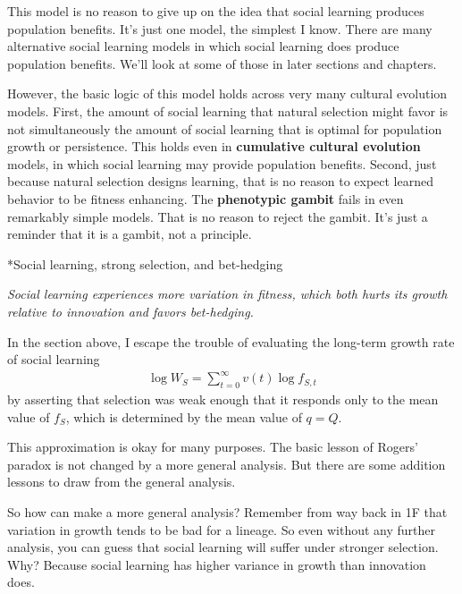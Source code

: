 \documentclass[10pt,reqno]{amsbook}
\makeatletter
\newcommand{\bemph}[1]{{\textbf{\textcolor{bemphcol}{#1}}}}
\renewcommand\section{\@startsection{section}{1}
\z@{.7\linespacing\@plus\linespacing}{.5\linespacing}
{\large\bfseries\itshape}}
\numberwithin{equation}{chapter}
\newenvironment{precis}
{\noi\itshape}
{\vspace{6pt}}
\newcommand{\noi}{\noindent}
\makeatother
\begin{document}
This model is no reason to give up on the idea that social learning produces population benefits. It's just one model, the simplest I know. There are many alternative social learning models in which social learning does produce population benefits. We'll look at some of those in later sections and chapters. 

However, the basic logic of this model holds across very many cultural evolution models. First, the amount of social learning that natural selection might favor is not simultaneously the amount of social learning that is optimal for population growth or persistence. This holds even in \bemph{cumulative cultural evolution} models, in which social learning may provide population benefits. Second, just because natural selection designs learning, that is no reason to expect learned behavior to be fitness enhancing. The \bemph{phenotypic gambit} fails in even remarkably simple models. That is no reason to reject the gambit. It's just a reminder that it is a gambit, not a principle.

\section*{Social learning, strong selection, and bet-hedging}

\begin{precis}Social learning experiences more variation in fitness, which both hurts its growth relative to innovation and favors bet-hedging.
\end{precis}

In the section above, I escape the trouble of evaluating the long-term growth rate of social learning
\begin{align*}
	\log W_S = \sum_{t=0}^\infty v(t) \log f_{S,t}
\end{align*}
by asserting that selection was weak enough that it responds only to the mean value of $f_S$, which is determined by the mean value of $q = Q$. 

This approximation is okay for many purposes. The basic lesson of Rogers' paradox is not changed by a more general analysis. But there are some addition lessons to draw from the general analysis.

So how can make a more general analysis? Remember from way back in 1F that variation in growth tends to be bad for a lineage. So even without any further analysis, you can guess that social learning will suffer under stronger selection. Why? Because social learning has higher variance in growth than innovation does. 
\end{document}
